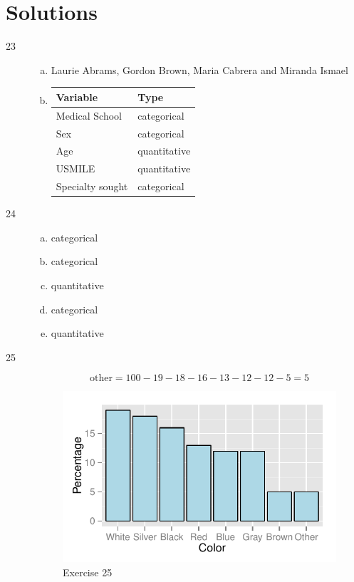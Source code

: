 \documentclass[letterpaper, landscape]{exam}
\begin{document}
    \section{Solutions}
    \begin{description}
      \item[23]
        \begin{enumerate}[(a)]
          \item Laurie Abrams, Gordon Brown, Maria Cabrera and Miranda Ismael 

          \item
            \begin{tabular}[H]{ll}
              \toprule
              Variable         & Type \\
              \midrule
              Medical School   & categorical \\
              Sex              & categorical \\
              Age              & quantitative \\
              USMILE           & quantitative \\
              Specialty sought & categorical \\
              \bottomrule
            \end{tabular}
        \end{enumerate}

      \newpage

      \item[24]
        \begin{enumerate}[(a)]
          \item categorical
          \item categorical
          \item quantitative
          \item categorical
          \item quantitative
        \end{enumerate}

      \item[25]
          \[
            \text{other} = 100 - 19 - 18 - 16 - 13 - 12 - 12 - 5 = 5
          \]

          \begin{figure}[H]
            \centering
            \includegraphics{figures/ex25.pdf}
            \caption{Exercise 25}
          \end{figure}


\end{description}
\end{document}
